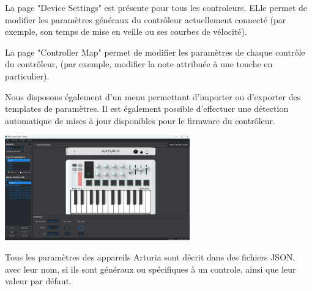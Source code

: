 \documentclass[francais]{rapportPFE}  %
\begin{document}
La page "Device Settings" est présente pour tous les controleurs. ELle permet de modifier les paramètres généraux du contrôleur actuellement connecté (par exemple, son temps de mise en veille ou ses courbes de vélocité).

La page "Controller Map" permet de modifier les paramètres de chaque contrôle du contrôleur, (par exemple, modifier la note attribuée à une touche en particulier).

Nous disposons également d'un menu permettant d'importer ou d'exporter des templates de paramètres. Il est également possible d'effectuer une détection automatique de mises à jour disponibles pour le firmware du contrôleur. 

\begin{center}
	\centering
	\includegraphics[width=0.6\textwidth]{graphics/mcc_existant.png}
	\begin{tiny}
	\end{tiny}
	\label{fig}
\end{center}

Tous les paramètres des appareils Arturia sont décrit dans des fichiers JSON, avec leur nom, si ils sont généraux ou spécifiques à un controle, ainsi que leur valeur par défaut. 
\end{document}
